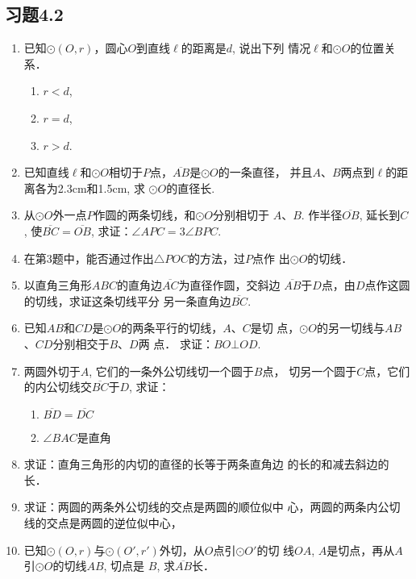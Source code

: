 \subsection*{习题4.2}
\begin{enumerate}
    \item 已知$\odot(O,r)$，圆心$O$到直线$\ell$的距离是$d$, 说出下列
    情况$\ell$和$\odot O$的位置关系．
\begin{multicols}{3}
    \begin{enumerate}
        \item $r<d$,
        \item $r=d$,
        \item $r>d$.
    \end{enumerate}
\end{multicols}

    \item 已知直线$\ell$和$\odot O$相切于$P$点，$\overline{AB}$是$\odot O$的一条直径，
    并且$A$、$B$两点到$\ell$的距离各为2.3cm和1.5cm, 求
    $\odot O$的直径长.
    \item 从$\odot O$外一点$P$作圆的两条切线，和$\odot O$分别相切于
$A$、$B$. 作半径$\overline{OB}$, 延长到$C$, 使$\overline{BC}=\overline{OB}$, 
求证：$\angle APC=3\angle BPC$.
\item 在第3题中，能否通过作出$\triangle POC$的方法，过$P$点作
出$\odot O$的切线．
\item 以直角三角形$ABC$的直角边$\overline{AC}$为直径作圆，交斜边
$\overline{AB}$于$D$点，由$D$点作这圆的切线，求证这条切线平分
另一条直角边$\overline{BC}$.
\item 已知$AB$和$CD$是$\odot O$的两条平行的切线，$A$、$C$是切
点，$\odot O$的另一切线与$AB$、$CD$分别相交于$B$、$D$两
点．
求证：$BO\bot OD$.
\item 两圆外切于$A$, 它们的一条外公切线切一个圆于$B$点，
切另一个圆于$C$点，它们的内公切线交$\overline{BC}$于$D$, 求证：
\begin{multicols}{2}
    \begin{enumerate}
        \item $\overline{BD}=\overline{DC}$
        \item $\angle BAC$是直角
    \end{enumerate}
\end{multicols}

\item 求证：直角三角形的内切的直径的长等于两条直角边
的长的和减去斜边的长．
\item 求证：两圆的两条外公切线的交点是两圆的顺位似中
心，两圆的两条内公切线的交点是两圆的逆位似中心，
\item 已知$\odot (O,r)$与$\odot (O',r')$外切，从$O$点引$\odot O'$的切
线$OA$, $A$是切点，再从$A$引$\odot O$的切线$AB$, 切点是
$B$, 求$\overline{AB}$长．
\end{enumerate}

